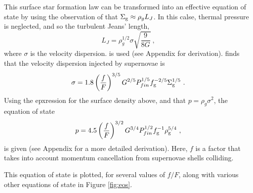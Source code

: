 This surface star formation law can be transformed into an effective equation of state by using the observation of \citet{schaye_star_2004} that $\Sigma_\mathrm{g} \approx \rho_g L_J$.
In this calse, thermal pressure is neglected, and so the turbulent Jeans' length,
\begin{equation}
\label{eqn:jeans}
L_J = \rho_g^{1/2} \sigma \sqrt{\frac{9}{8G}}~,
\end{equation}
where $\sigma$ is the velocity dispersion.
is used (see Appendix for derivation).
\citet{martizzi_supernova_2015} finds that the velocity dispersion injected by supernovae is
\begin{equation}
\label{eqn:martdisp}
\sigma = 1.8 \left(\frac{f}{F}\right)^{{3/5}} G^{{2/5}} P_{fin}^{{1/5}} f_\mathrm{g}^{{-2/5}} \Sigma_\mathrm{g}^{{1/5}}~.
\end{equation}
Using the epxression for the surface density above, and that $p = \rho_g \sigma^2$, the equation of state
\begin{equation}
\label{eqn:eos}
p = 4.5\left(\frac{f}{F}\right)^{{3/2}} G^{{3/4}} P_{fin}^{{1/2}} f_\mathrm{g}^{-1} \rho_\mathrm{g}^{{5/4}}~,
\end{equation}
is given (see Appendix for a more detailed derivation).
Here, $f$ is a factor that takes into account momentum cancellation from supernovae shells colliding.

This equation of state is plotted, for several values of $f/F$, along with various other equations of state in Figure \ref{fig:eos}.

